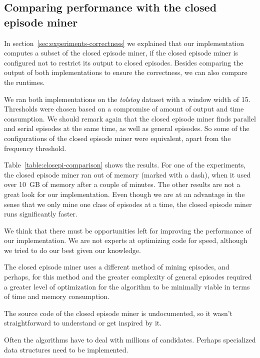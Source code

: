 \subsection{Comparing performance with the closed episode miner}

In section~\ref{sec:experiments-correctness} we explained that our implementation computes a subset of the closed episode miner, if the closed episode miner is configured not to restrict its output to closed episodes. Besides comparing the output of both implementations to ensure the correctness, we can also compare the runtimes.

We ran both implementations on the \emph{tolstoy} dataset with a window width of 15. Thresholds were chosen based on a compromise of amount of output and time consumption. We should remark again that the closed episode miner finds parallel and serial episodes at the same time, as well as general episodes. So some of the configurations of the closed episode miner were equivalent, apart from the frequency threshold.

Table~\ref{table:closepi-comparison} shows the results. For one of the experiments, the closed episode miner ran out of memory (marked with a dash), when it used over 10~GB of memory after a couple of minutes. The other results are not a great look for our implementation. Even though we are at an advantage in the sense that we only mine one class of episodes at a time, the closed episode miner runs significantly faster.

We think that there must be opportunities left for improving the performance of our implementation. We are not experts at optimizing code for speed, although we tried to do our best given our knowledge.


The closed episode miner uses a different method of mining episodes, and perhaps, for this method and the greater complexity of general episodes required a greater level of optimization for the algorithm to be minimally viable in terms of time and memory consumption.

The source code of the closed episode miner is undocumented, so it wasn't straightforward to understand or get inspired by it.

Often the algorithms have to deal with millions of candidates. Perhaps specialized data structures need to be implemented.


